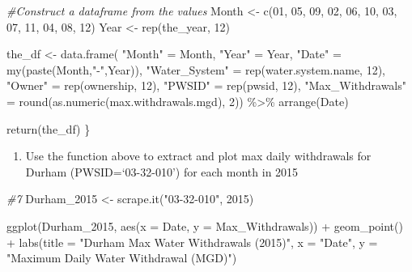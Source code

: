 \documentclass[
]{article}
\newenvironment{Shaded}{\begin{snugshade}}{\end{snugshade}}
\newcommand{\AttributeTok}[1]{\textcolor[rgb]{0.77,0.63,0.00}{#1}}
\newcommand{\CommentTok}[1]{\textcolor[rgb]{0.56,0.35,0.01}{\textit{#1}}}
\newcommand{\DecValTok}[1]{\textcolor[rgb]{0.00,0.00,0.81}{#1}}
\newcommand{\FunctionTok}[1]{\textcolor[rgb]{0.00,0.00,0.00}{#1}}
\newcommand{\NormalTok}[1]{#1}
\newcommand{\OtherTok}[1]{\textcolor[rgb]{0.56,0.35,0.01}{#1}}
\newcommand{\SpecialCharTok}[1]{\textcolor[rgb]{0.00,0.00,0.00}{#1}}
\newcommand{\StringTok}[1]{\textcolor[rgb]{0.31,0.60,0.02}{#1}}
\providecommand{\tightlist}{%
  \setlength{\itemsep}{0pt}\setlength{\parskip}{0pt}}
\begin{document}
\begin{Shaded}
\begin{Highlighting}[]
  
  \CommentTok{\#Construct a dataframe from the values}
\NormalTok{  Month }\OtherTok{\textless{}{-}} \FunctionTok{c}\NormalTok{(}\DecValTok{01}\NormalTok{, }\DecValTok{05}\NormalTok{, }\DecValTok{09}\NormalTok{, }\DecValTok{02}\NormalTok{, }\DecValTok{06}\NormalTok{, }\DecValTok{10}\NormalTok{, }\DecValTok{03}\NormalTok{, }\DecValTok{07}\NormalTok{, }\DecValTok{11}\NormalTok{, }\DecValTok{04}\NormalTok{, }\DecValTok{08}\NormalTok{, }\DecValTok{12}\NormalTok{)}
\NormalTok{  Year }\OtherTok{\textless{}{-}} \FunctionTok{rep}\NormalTok{(the\_year, }\DecValTok{12}\NormalTok{)}

\NormalTok{  the\_df }\OtherTok{\textless{}{-}} \FunctionTok{data.frame}\NormalTok{(}
    \StringTok{"Month"} \OtherTok{=}\NormalTok{ Month,}
    \StringTok{"Year"} \OtherTok{=}\NormalTok{ Year,}
    \StringTok{"Date"} \OtherTok{=} \FunctionTok{my}\NormalTok{(}\FunctionTok{paste}\NormalTok{(Month,}\StringTok{"{-}"}\NormalTok{,Year)),}
    \StringTok{"Water\_System"} \OtherTok{=} \FunctionTok{rep}\NormalTok{(water.system.name, }\DecValTok{12}\NormalTok{),}
    \StringTok{"Owner"} \OtherTok{=} \FunctionTok{rep}\NormalTok{(ownership, }\DecValTok{12}\NormalTok{),}
    \StringTok{"PWSID"} \OtherTok{=} \FunctionTok{rep}\NormalTok{(pwsid, }\DecValTok{12}\NormalTok{),}
    \StringTok{"Max\_Withdrawals"} \OtherTok{=} \FunctionTok{round}\NormalTok{(}\FunctionTok{as.numeric}\NormalTok{(max.withdrawals.mgd), }\DecValTok{2}\NormalTok{)) }\SpecialCharTok{\%\textgreater{}\%}
    \FunctionTok{arrange}\NormalTok{(Date)}
  
  \FunctionTok{return}\NormalTok{(the\_df)}
\NormalTok{\}}
\end{Highlighting}
\end{Shaded}

\begin{enumerate}
\def\labelenumi{\arabic{enumi}.}
\setcounter{enumi}{6}
\tightlist
\item
  Use the function above to extract and plot max daily withdrawals for
  Durham (PWSID=`03-32-010') for each month in 2015
\end{enumerate}

\begin{Shaded}
\begin{Highlighting}[]
\CommentTok{\#7}
\NormalTok{Durham\_2015 }\OtherTok{\textless{}{-}} \FunctionTok{scrape.it}\NormalTok{(}\StringTok{"03{-}32{-}010"}\NormalTok{, }\DecValTok{2015}\NormalTok{)}

\FunctionTok{ggplot}\NormalTok{(Durham\_2015, }\FunctionTok{aes}\NormalTok{(}\AttributeTok{x =}\NormalTok{ Date, }\AttributeTok{y =}\NormalTok{ Max\_Withdrawals)) }\SpecialCharTok{+}
  \FunctionTok{geom\_point}\NormalTok{() }\SpecialCharTok{+}
  \FunctionTok{labs}\NormalTok{(}\AttributeTok{title =} \StringTok{"Durham Max Water Withdrawals (2015)"}\NormalTok{, }\AttributeTok{x =} \StringTok{"Date"}\NormalTok{, }\AttributeTok{y =} \StringTok{"Maximum Daily Water Withdrawal (MGD)"}\NormalTok{)}
\end{Highlighting}
\end{Shaded}
\end{document}
